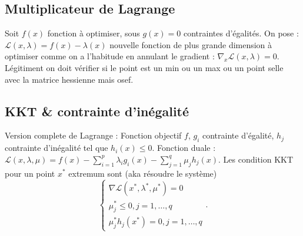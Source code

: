 \documentclass{article}
\theoremstyle{plain}%
\theoremstyle{definition}
\theoremstyle{remark}
\begin{document}
\subsection{Multiplicateur de Lagrange}
Soit $ f(x) $ fonction à optimiser, sous $ g(x) = 0 $ contraintes d'égalités. On pose : $ \mathcal{L}(x,\lambda) = f(x) - \lambda  (x)$ nouvelle fonction de plus grande dimension à optimiser comme on a l'habitude en annulant le gradient : $ \nabla _x \mathcal{L}(x,\lambda ) = 0 $. Légitiment on doit vérifier si le point est un min ou un max ou un point selle avec la matrice hessienne mais osef.

\subsection{KKT \& contrainte d'inégalité}
Version complete de Lagrange : Fonction objectif $ f $, $ g_i $ contrainte d'égalité, $ h_j $ contrainte d'inégalité tel que $ h_i(x) \leq 0 $. Fonction duale : $ \mathcal{L} (x, \lambda , \mu) = f(x) - \sum_{i=1}^{p} \lambda _i g_i(x) - \sum_{j=1}^{q} \mu _j h_j(x)$. Les condition KKT pour un point $ x^* $ extremum sont (aka résoudre le système)
\[
    \begin{cases}
    \nabla \mathcal{L}(x^*, \lambda^* , \mu^* ) = 0 \\
    \mu ^*_j \leq 0, j = 1, \dots, q \\
    \mu ^*_j h_j(x^*) = 0, j =1, \dots, q
    \end{cases} 
.\]
\end{document}
